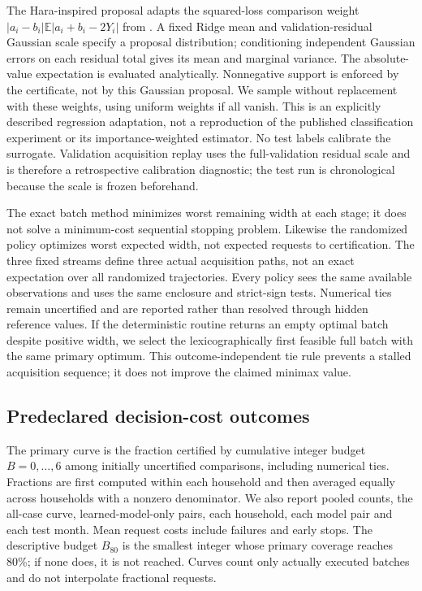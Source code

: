 \documentclass[12pt]{article}
\begin{document}
The Hara-inspired proposal adapts the squared-loss comparison weight
$|a_i-b_i|\mathbb{E}|a_i+b_i-2Y_i|$ from \cite{hara}. A fixed Ridge mean and
validation-residual Gaussian scale specify a proposal distribution;
conditioning independent Gaussian errors on each residual total gives its
mean and marginal variance. The absolute-value expectation is evaluated
analytically. Nonnegative support is enforced by the certificate, not by
this Gaussian proposal. We sample without replacement with these weights,
using uniform weights if all vanish. This is an explicitly described
regression adaptation, not a reproduction of the published classification
experiment or its importance-weighted estimator. No test labels calibrate
the surrogate. Validation acquisition replay uses the full-validation
residual scale and is therefore a retrospective calibration diagnostic;
the test run is chronological because the scale is frozen beforehand.

The exact batch method minimizes worst remaining width at each stage; it
does not solve a minimum-cost sequential stopping problem. Likewise the
randomized policy optimizes worst expected width, not expected requests to
certification. The three fixed streams define three actual acquisition
paths, not an exact expectation over all randomized trajectories. Every
policy sees the same available observations and uses the same enclosure and
strict-sign tests. Numerical ties remain uncertified and are reported rather
than resolved through hidden reference values.
If the deterministic routine returns an empty optimal batch despite positive
width, we select the lexicographically first feasible full batch with the
same primary optimum. This outcome-independent tie rule prevents a stalled
acquisition sequence; it does not improve the claimed minimax value.

\subsection{Predeclared decision-cost outcomes}\label{sec:external-metric}
The primary curve is the fraction certified by cumulative integer budget
$B=0,\ldots,6$ among initially uncertified comparisons, including numerical
ties. Fractions are first computed within each household and then averaged
equally across households with a nonzero denominator. We also report pooled
counts, the all-case curve, learned-model-only pairs, each household, each
model pair and each test month. Mean request costs include failures and
early stops. The descriptive budget $B_{80}$ is the smallest integer whose
primary coverage reaches 80\%; if none does, it is not reached. Curves count
only actually executed batches and do not interpolate fractional requests.
\end{document}
